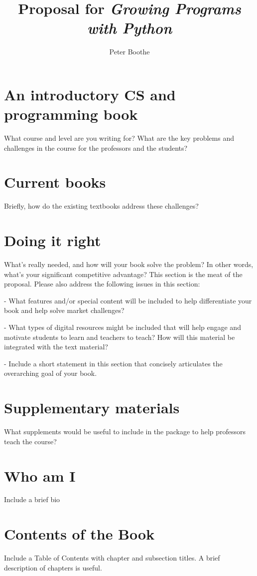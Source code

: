 \documentclass[11pt]{article}
\title{Proposal for {\it Growing Programs with Python}}
\author{Peter Boothe}
\begin{document}
\section{An introductory CS and programming book}
What course and level are you writing for?  What are the key problems and challenges in the course for the professors and the students?

\section{Current books}
Briefly, how do the existing textbooks address these challenges?

\section{Doing it right}
What's really needed, and how will your book solve the problem?  In other words, what's your significant competitive advantage?  This section is the meat of the proposal.  Please also address the following issues in this section:

- What features and/or special content will be included to help differentiate your book and help solve market challenges?

- What types of digital resources might be included that will help engage and motivate students to learn and teachers to teach?  How will this material be integrated with the text material?

- Include a short statement in this section that concisely articulates the overarching goal of your book.

\section{Supplementary materials}
What supplements would be useful to include in the package to help professors teach the course?

\section{Who am I}
Include a brief bio

\section{Contents of the Book}
Include a Table of Contents with chapter and subsection titles.  A brief description of chapters is useful.
\end{document}
